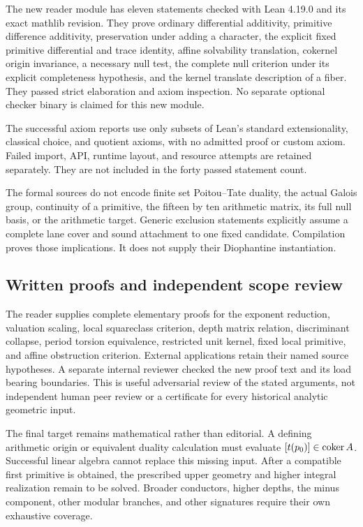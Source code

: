 The new reader module has eleven statements checked with Lean 4.19.0 and its exact mathlib revision. They prove ordinary differential additivity, primitive difference additivity, preservation under adding a character, the explicit fixed primitive differential and trace identity, affine solvability translation, cokernel origin invariance, a necessary null test, the complete null criterion under its explicit completeness hypothesis, and the kernel translate description of a fiber. They passed strict elaboration and axiom inspection. No separate optional checker binary is claimed for this new module.

The successful axiom reports use only subsets of Lean's standard extensionality, classical choice, and quotient axioms, with no admitted proof or custom axiom. Failed import, API, runtime layout, and resource attempts are retained separately. They are not included in the forty passed statement count.

The formal sources do not encode finite set Poitou--Tate duality, the actual Galois group, continuity of a primitive, the fifteen by ten arithmetic matrix, its full null basis, or the arithmetic target. Generic exclusion statements explicitly assume a complete lane cover and sound attachment to one fixed candidate. Compilation proves those implications. It does not supply their Diophantine instantiation.

\subsection{Written proofs and independent scope review}
The reader supplies complete elementary proofs for the exponent reduction, valuation scaling, local squareclass criterion, depth matrix relation, discriminant collapse, period torsion equivalence, restricted unit kernel, fixed local primitive, and affine obstruction criterion. External applications retain their named source hypotheses. A separate internal reviewer checked the new proof text and its load bearing boundaries. This is useful adversarial review of the stated arguments, not independent human peer review or a certificate for every historical analytic geometric input.

The final target remains mathematical rather than editorial. A defining arithmetic origin or equivalent duality calculation must evaluate $[t(p_0)]\in\operatorname{coker} A$. Successful linear algebra cannot replace this missing input. After a compatible first primitive is obtained, the prescribed upper geometry and higher integral realization remain to be solved. Broader conductors, higher depths, the minus component, other modular branches, and other signatures require their own exhaustive coverage.
